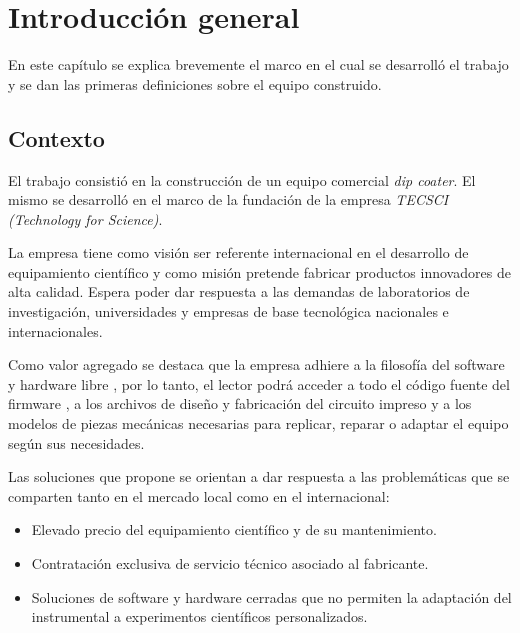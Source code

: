 
\chapter{Introducción general} %

\label{Chapter1} %


En este capítulo se explica brevemente el marco en el cual se desarrolló el trabajo y se dan las primeras definiciones sobre el equipo construido. 
\section{Contexto}

El trabajo consistió en la construcción de un equipo comercial \textit{dip coater}. El mismo se desarrolló en el marco de la fundación de la empresa \textit{TECSCI (Technology for Science)}.

La empresa tiene como visión ser referente internacional en el desarrollo de equipamiento científico y como misión pretende fabricar productos innovadores de alta calidad. Espera poder dar respuesta a las demandas de laboratorios de investigación, universidades y empresas de base tecnológica nacionales e internacionales.

Como valor agregado se destaca que la empresa adhiere a la filosofía del software y hardware libre \citep{web_oshwa}, por lo tanto, el lector podrá acceder a todo el código fuente del firmware \citep{web_firmware_tecsci}, a los archivos de diseño y fabricación del circuito impreso \citep{web_hardware_tecsci} y a los modelos de piezas mecánicas necesarias para replicar, reparar o adaptar el equipo según sus necesidades.

Las soluciones que propone se orientan a dar respuesta a las problemáticas que se comparten tanto en el mercado local como en el internacional:
\begin{itemize}
\item Elevado precio del equipamiento científico y de su mantenimiento.
\item Contratación exclusiva de servicio técnico asociado al fabricante.
\item Soluciones de software y hardware cerradas que no permiten la adaptación del instrumental a experimentos científicos personalizados.
\end{itemize}


